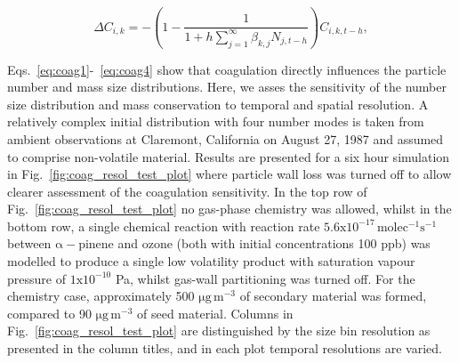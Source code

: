 \documentclass[gmd, manuscript]{copernicus}
\begin{document}
\begin{equation} \label{eq:coag4}
\Delta C_{i,k} = -\left(1-\frac{1}{1+h\sum_{j=1}^{\infty}\beta_{k,j}N_{j,t-h}}\right)C_{i,k,t-h},
\end{equation}

Eqs.~\ref{eq:coag1}-~\ref{eq:coag4} show that coagulation directly influences the particle number and mass size distributions.  Here, we asses the sensitivity of the number size distribution and mass conservation to temporal and spatial resolution.  A relatively complex initial distribution with four number modes is taken from ambient observations at Claremont, California on August 27, 1987 \citep{Jacobson2005} and assumed to comprise non-volatile material.  Results are presented for a six hour simulation in Fig.~\ref{fig:coag_resol_test_plot} where particle wall loss was turned off to allow clearer assessment of the coagulation sensitivity.  In the top row of Fig.~\ref{fig:coag_resol_test_plot} no gas-phase chemistry was allowed, whilst in the bottom row, a single chemical reaction with reaction rate $\mathrm{5.6x10^{-17}\, molec^{-1}s^{-1}}$  between $\mathrm{\alpha-}$pinene and ozone (both with initial concentrations 100 ppb) was modelled to produce a single low volatility product with saturation vapour pressure of $\mathrm{1x10^{-10}}$ Pa, whilst gas-wall partitioning was turned off.  For the chemistry case, approximately 500 $\mathrm{\mu g\, m^{-3}}$ of secondary material was formed, compared to  90 $\mathrm{\mu g\,m^{-3}}$ of seed material.  Columns in Fig.~\ref{fig:coag_resol_test_plot} are distinguished by the size bin resolution as presented in the column titles, and in each plot temporal resolutions are varied.
\end{document}
